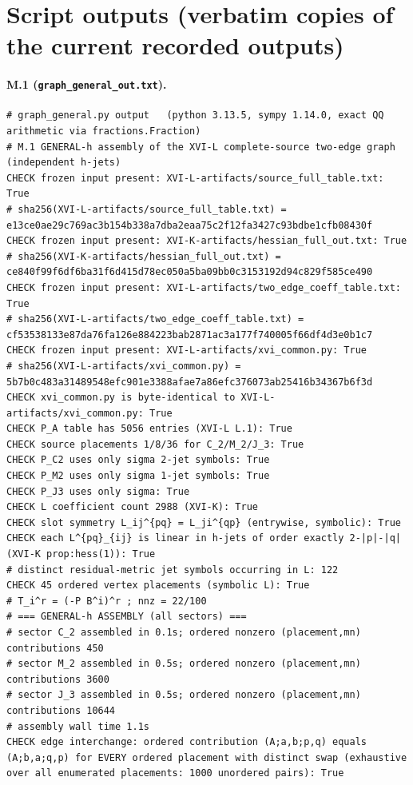 \documentclass{article}
\theoremstyle{remark}
\begin{document}
\section{Script outputs (verbatim copies of the current recorded outputs)}
\label{app:out}
\paragraph{M.1 (\texttt{graph\_general\_out.txt}).}
\begin{lstlisting}
# graph_general.py output   (python 3.13.5, sympy 1.14.0, exact QQ arithmetic via fractions.Fraction)
# M.1 GENERAL-h assembly of the XVI-L complete-source two-edge graph (independent h-jets)
CHECK frozen input present: XVI-L-artifacts/source_full_table.txt: True
# sha256(XVI-L-artifacts/source_full_table.txt) = e13ce0ae29c769ac3b154b338a7dba2eaa75c2f12fa3427c93bdbe1cfb08430f
CHECK frozen input present: XVI-K-artifacts/hessian_full_out.txt: True
# sha256(XVI-K-artifacts/hessian_full_out.txt) = ce840f99f6df6ba31f6d415d78ec050a5ba09bb0c3153192d94c829f585ce490
CHECK frozen input present: XVI-L-artifacts/two_edge_coeff_table.txt: True
# sha256(XVI-L-artifacts/two_edge_coeff_table.txt) = cf53538133e87da76fa126e884223bab2871ac3a177f740005f66df4d3e0b1c7
CHECK frozen input present: XVI-L-artifacts/xvi_common.py: True
# sha256(XVI-L-artifacts/xvi_common.py) = 5b7b0c483a31489548efc901e3388afae7a86efc376073ab25416b34367b6f3d
CHECK xvi_common.py is byte-identical to XVI-L-artifacts/xvi_common.py: True
CHECK P_A table has 5056 entries (XVI-L L.1): True
CHECK source placements 1/8/36 for C_2/M_2/J_3: True
CHECK P_C2 uses only sigma 2-jet symbols: True
CHECK P_M2 uses only sigma 1-jet symbols: True
CHECK P_J3 uses only sigma: True
CHECK L coefficient count 2988 (XVI-K): True
CHECK slot symmetry L_ij^{pq} = L_ji^{qp} (entrywise, symbolic): True
CHECK each L^{pq}_{ij} is linear in h-jets of order exactly 2-|p|-|q| (XVI-K prop:hess(1)): True
# distinct residual-metric jet symbols occurring in L: 122
CHECK 45 ordered vertex placements (symbolic L): True
# T_i^r = (-P B^i)^r ; nnz = 22/100
# === GENERAL-h ASSEMBLY (all sectors) ===
# sector C_2 assembled in 0.1s; ordered nonzero (placement,mn) contributions 450
# sector M_2 assembled in 0.5s; ordered nonzero (placement,mn) contributions 3600
# sector J_3 assembled in 0.5s; ordered nonzero (placement,mn) contributions 10644
# assembly wall time 1.1s
CHECK edge interchange: ordered contribution (A;a,b;p,q) equals (A;b,a;q,p) for EVERY ordered placement with distinct swap (exhaustive over all enumerated placements: 1000 unordered pairs): True

\end{lstlisting}
\end{document}
